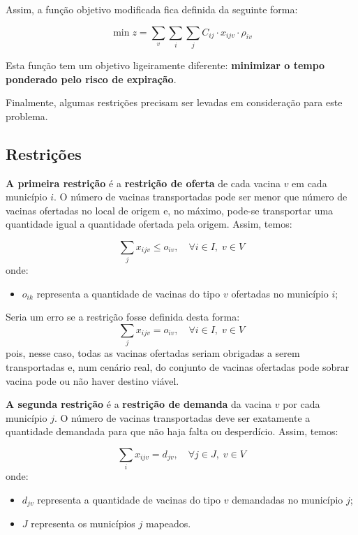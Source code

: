 Assim, a função objetivo modificada fica definida da seguinte forma:

\begin{equation}
    \min z = \sum_{v} \sum_{i} \sum_{j} C_{ij} \cdot x_{ijv} \cdot \rho_{iv}
    \label{eq:intermunicipal_com_penalidade}
\end{equation}

Esta função tem um objetivo ligeiramente diferente: \textbf{minimizar o tempo ponderado pelo risco de expiração}.

Finalmente, algumas restrições precisam ser levadas em consideração para este problema.

\subsection{Restrições}

\textbf{A primeira restrição} é a \textbf{restrição de oferta} de cada vacina $v$ em cada município $i$. 
O número de vacinas transportadas pode ser menor que número de vacinas ofertadas no local de origem e, no máximo, pode-se transportar uma quantidade igual a quantidade ofertada pela origem. Assim, temos:

\begin{equation*}
    \sum_{j} x_{ijv} \le o_{iv}, \quad \forall i \in I, \; v \in V
\end{equation*}
onde:
\begin{itemize}
    \item $o_{ik}$ representa a quantidade de vacinas do tipo $v$ ofertadas no município $i$;
\end{itemize}

Seria um erro se a restrição fosse definida desta forma:
\begin{equation*}
    \sum_{j} x_{ijv} = o_{iv}, \quad \forall i \in I, \; v \in V
\end{equation*}
pois, nesse caso, todas as vacinas ofertadas seriam obrigadas a serem transportadas e, num cenário real, do conjunto de vacinas ofertadas pode sobrar vacina pode ou não haver destino viável.

\textbf{A segunda restrição} é a \textbf{restrição de demanda} da vacina $v$ por cada município $j$. 
O número de vacinas transportadas deve ser exatamente a quantidade demandada para que não haja falta ou desperdício. Assim, temos:

\begin{equation*}
    \sum_{i} x_{ijv} = d_{jv}, \quad \forall j \in J, \; v \in V
\end{equation*}
onde:
\begin{itemize}
    \item $d_{jv}$ representa a quantidade de vacinas do tipo $v$ demandadas no município $j$;
    \item $J$ representa os municípios $j$ mapeados.
\end{itemize}

